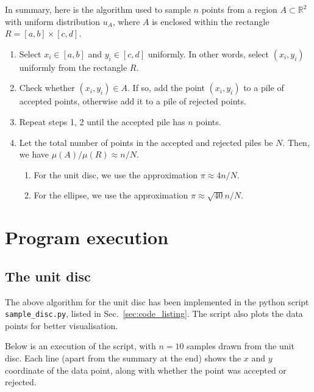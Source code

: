 \documentclass[10pt]{article}
\newcommand{\R}{\mathbb{R}}
\begin{document}
    In summary, here is the algorithm used to sample $n$ points from a region $A
    \subset \R^2$ with uniform distribution $u_A$, where $A$ is enclosed within the
    rectangle $R = [a, b] \times [c, d]$.
    \begin{enumerate}
        \item Select $x_i \in [a, b]$ and $y_i \in [c, d]$ uniformly. In other words,
        select $(x_i, y_i)$ uniformly from the rectangle $R$.
        \item Check whether $(x_i, y_i) \in A$. If so, add the point $(x_i, y_i)$ to
        a pile of accepted points, otherwise add it to a pile of rejected points.
        \item Repeat steps 1, 2 until the accepted pile has $n$ points.
        \item Let the total number of points in the accepted and rejected piles be
        $N$. Then, we have $\mu(A) / \mu(R) \approx n / N$.
        \begin{enumerate}
            \item For the unit disc, we use the approximation $\pi \approx 4n/N$.  
            \item For the ellipse, we use the approximation $\pi \approx
            \sqrt{40}n/N$.
        \end{enumerate}
    \end{enumerate}



    \section{Program execution}
    
    \subsection{The unit disc}
    
    The above algorithm for the unit disc has been implemented in the python script
    \texttt{sample\_disc.py}, listed in Sec.~\ref{sec:code_listing}. The script also
    plots the data points for better visualisation.
    
    Below is an execution of the script, with $n = 10$ samples drawn from the unit
    disc. Each line (apart from the summary at the end) shows the $x$ and $y$
    coordinate of the data point, along with whether the point was accepted or
    rejected.
\end{document}
